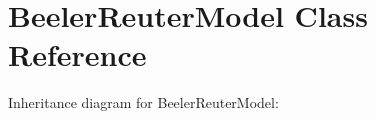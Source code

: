 \hypertarget{classBeelerReuterModel}{}\section{Beeler\+Reuter\+Model Class Reference}
\label{classBeelerReuterModel}


Inheritance diagram for Beeler\+Reuter\+Model\+:
